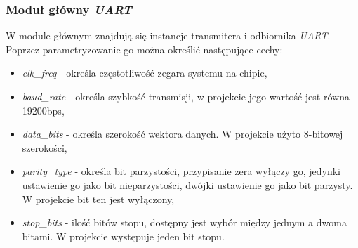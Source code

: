 \documentclass[11pt,a4paper]{article}
\begin{document}
	\subsubsection{Moduł główny \textit{UART}}
	W module głównym znajdują się instancje transmitera i odbiornika \textit{UART}.  Poprzez parametryzowanie go można określić następujące cechy:
	\begin{itemize}
		\item \textit{clk\_freq} - określa częstotliwość zegara systemu na chipie,
		\item \textit{baud\_rate} - określa szybkość transmisji, w projekcie jego wartość jest równa 19200bps,
		\item \textit{data\_bits} - określa szerokość wektora danych. W projekcie użyto 8-bitowej szerokości,
		\item \textit{parity\_type} - określa bit parzystości, przypisanie zera wyłączy go, jedynki ustawienie go jako bit nieparzystości, dwójki ustawienie go jako bit parzysty. W projekcie bit ten jest wyłączony,
		\item \textit{stop\_bits} - ilość bitów stopu, dostępny jest wybór między jednym a dwoma bitami. W projekcie występuje jeden bit stopu.
	\end{itemize}
\end{document}

